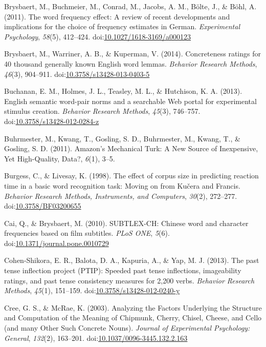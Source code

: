 \documentclass[english,man]{apa6}
\theoremstyle{definition}
\theoremstyle{definition}
\theoremstyle{definition}
\theoremstyle{remark}
\begin{document}
\hypertarget{ref-Brysbaert2011}{}
Brysbaert, M., Buchmeier, M., Conrad, M., Jacobs, A. M., Bölte, J., \&
Böhl, A. (2011). The word frequency effect: A review of recent
developments and implications for the choice of frequency estimates in
German. \emph{Experimental Psychology}, \emph{58}(5), 412--424.
doi:\href{https://doi.org/10.1027/1618-3169/a000123}{10.1027/1618-3169/a000123}

\hypertarget{ref-Brysbaert2013}{}
Brysbaert, M., Warriner, A. B., \& Kuperman, V. (2014). Concreteness
ratings for 40 thousand generally known English word lemmas.
\emph{Behavior Research Methods}, \emph{46}(3), 904--911.
doi:\href{https://doi.org/10.3758/s13428-013-0403-5}{10.3758/s13428-013-0403-5}

\hypertarget{ref-Buchanan2013}{}
Buchanan, E. M., Holmes, J. L., Teasley, M. L., \& Hutchison, K. A.
(2013). English semantic word-pair norms and a searchable Web portal for
experimental stimulus creation. \emph{Behavior Research Methods},
\emph{45}(3), 746--757.
doi:\href{https://doi.org/10.3758/s13428-012-0284-z}{10.3758/s13428-012-0284-z}

\hypertarget{ref-Buhrmester2011}{}
Buhrmester, M., Kwang, T., Gosling, S. D., Buhrmester, M., Kwang, T., \&
Gosling, S. D. (2011). Amazon's Mechanical Turk: A New Source of
Inexpensive, Yet High-Quality, Data?, \emph{6}(1), 3--5.

\hypertarget{ref-Burgess1998}{}
Burgess, C., \& Livesay, K. (1998). The effect of corpus size in
predicting reaction time in a basic word recognition task: Moving on
from Kučera and Francis. \emph{Behavior Research Methods, Instruments,
and Computers}, \emph{30}(2), 272--277.
doi:\href{https://doi.org/10.3758/BF03200655}{10.3758/BF03200655}

\hypertarget{ref-Cai2010}{}
Cai, Q., \& Brysbaert, M. (2010). SUBTLEX-CH: Chinese word and character
frequencies based on film subtitles. \emph{PLoS ONE}, \emph{5}(6).
doi:\href{https://doi.org/10.1371/journal.pone.0010729}{10.1371/journal.pone.0010729}

\hypertarget{ref-Cohen-Shikora2013}{}
Cohen-Shikora, E. R., Balota, D. A., Kapuria, A., \& Yap, M. J. (2013).
The past tense inflection project (PTIP): Speeded past tense
inflections, imageability ratings, and past tense consistency measures
for 2,200 verbs. \emph{Behavior Research Methods}, \emph{45}(1),
151--159.
doi:\href{https://doi.org/10.3758/s13428-012-0240-y}{10.3758/s13428-012-0240-y}

\hypertarget{ref-Cree2003}{}
Cree, G. S., \& McRae, K. (2003). Analyzing the Factors Underlying the
Structure and Computation of the Meaning of Chipmunk, Cherry, Chisel,
Cheese, and Cello (and many Other Such Concrete Nouns). \emph{Journal of
Experimental Psychology: General}, \emph{132}(2), 163--201.
doi:\href{https://doi.org/10.1037/0096-3445.132.2.163}{10.1037/0096-3445.132.2.163}
\end{document}
